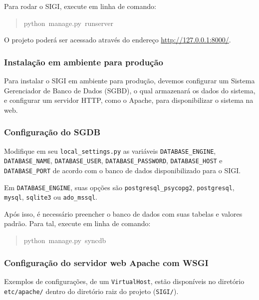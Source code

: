 Para rodar o SIGI, execute em linha de comando:
\begin{quote}{\ttfamily \raggedright \noindent
python~manage.py~runserver
}\end{quote}

O projeto poderá ser acessado através do endereço
\href{http://127.0.0.1:8000/}{http://127.0.0.1:8000/}.



\hypertarget{instala-o-em-ambiente-para-produ-o}{}
\subsubsection*{Instalação em ambiente para produção}

Para instalar o SIGI em ambiente para produção, devemos configurar um
Sistema Gerenciador de Banco de Dados (SGBD), o qual armazenará os
dados do sistema, e configurar um servidor HTTP, como o Apache, para
disponibilizar o sistema na web.



\hypertarget{configura-o-do-sgdb}{}
\subsubsection*{Configuração do SGDB}

Modifique em seu \texttt{local{\_}settings.py} as variáveis
\texttt{DATABASE{\_}ENGINE}, \texttt{DATABASE{\_}NAME}, \texttt{DATABASE{\_}USER},
\texttt{DATABASE{\_}PASSWORD}, \texttt{DATABASE{\_}HOST} e \texttt{DATABASE{\_}PORT} de acordo
com o banco de dados disponibilizado para o SIGI.

Em \texttt{DATABASE{\_}ENGINE}, suas opções são \texttt{postgresql{\_}psycopg2},
\texttt{postgresql}, \texttt{mysql}, \texttt{sqlite3} ou \texttt{ado{\_}mssql}.

Após isso, é necessário preencher o banco de dados
com suas tabelas e valores padrão. Para tal, execute em linha de
comando:
\begin{quote}{\ttfamily \raggedright \noindent
python~manage.py~syncdb
}\end{quote}



\hypertarget{configura-o-do-servidor-web-apache-com-wsgi}{}
\subsubsection*{Configuração do servidor web Apache com WSGI}

Exemplos de configurações, de um \texttt{VirtualHost}, estão disponíveis no
diretório \texttt{etc/apache/} dentro do diretório raiz do projeto
(\texttt{SIGI/}).

%
%
